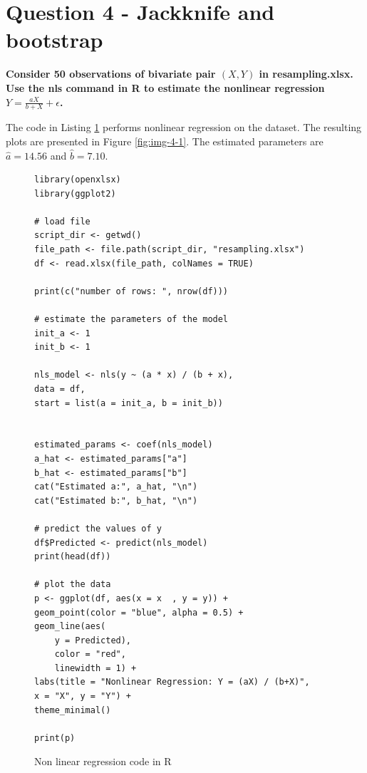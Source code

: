 \documentclass[]{article}
\begin{document}
\section{Question 4 - Jackknife and bootstrap}

\textbf{Consider 50 observations of bivariate pair $(X,Y)$ in resampling.xlsx. Use the nls command in R to estimate the nonlinear regression $Y=\frac{aX}{b+X} + \epsilon$.}

\bigskip

The code in Listing \ref{lst:nls} performs nonlinear regression on the dataset. The resulting plots are presented in Figure \ref{fig:img-4-1}. The estimated parameters are $\hat{a} = 14.56$ and $\hat{b} = 7.10$.


\begin{figure}[H]
	\captionsetup{type=lstlisting}
	\begin{lstlisting}
library(openxlsx)
library(ggplot2)

# load file
script_dir <- getwd()
file_path <- file.path(script_dir, "resampling.xlsx")
df <- read.xlsx(file_path, colNames = TRUE)

print(c("number of rows: ", nrow(df)))

# estimate the parameters of the model
init_a <- 1
init_b <- 1

nls_model <- nls(y ~ (a * x) / (b + x),
data = df,
start = list(a = init_a, b = init_b))


estimated_params <- coef(nls_model)
a_hat <- estimated_params["a"]
b_hat <- estimated_params["b"]
cat("Estimated a:", a_hat, "\n")
cat("Estimated b:", b_hat, "\n")

# predict the values of y
df$Predicted <- predict(nls_model)
print(head(df))

# plot the data
p <- ggplot(df, aes(x = x  , y = y)) +
geom_point(color = "blue", alpha = 0.5) +
geom_line(aes(
	y = Predicted),
	color = "red",
	linewidth = 1) +
labs(title = "Nonlinear Regression: Y = (aX) / (b+X)",
x = "X", y = "Y") +
theme_minimal()

print(p)
	\end{lstlisting}
\caption{Non linear regression code in R}
\label{lst:nls}
\end{figure}
\end{document}
